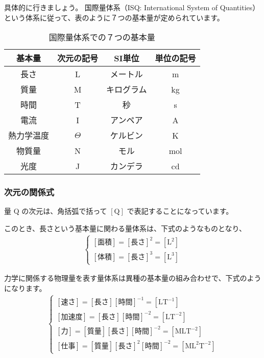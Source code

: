 \documentclass[uplatex,dvipdfmx,a4paper,11pt]{jsreport}
\begin{document}
具体的に行きましょう。
国際量体系（ISQ: International System of Quantities）という体系に従って、表のように７つの基本量が定められています。
\begin{table}[htb]
	\begin{center}
		\caption{国際量体系での７つの基本量}
		\label{tab:kihon}
		\begin{tabular}{|c|c||c|c|} \hline
			基本量 		& 次元の記号 & SI単位\index{たんい@単位} 		& 単位の記号\\ \hline \hline
			長さ		& L			& メートル 		& m \\ \hline
			質量		& M			& キログラム 	& kg \\ \hline
			時間		& T			& 秒 			& s \\ \hline
			電流		& I			& アンペア 		& A \\ \hline
			熱力学温度	& $\Theta$	& ケルビン 		& K \\ \hline
			物質量		& N			& モル 			& mol \\ \hline
			光度		& J			& カンデラ 		& cd \\ \hline
		\end{tabular}
	\end{center}
\end{table}

\subsubsection{次元の関係式}
量 $\mathrm{Q}$ の次元は、角括弧で括って $[\mathrm{Q}]$ で表記することになっています。

このとき、長さという基本量に関わる量体系は、下式のようなものとなり、
\begin{align*}
	\begin{cases}
		[\text{面積}] = [\text{長さ}]^2 = [\mathrm{L}^2] \\[8pt]
		[\text{体積}] = [\text{長さ}]^3 = [\mathrm{L}^3]
	\end{cases}
\end{align*}

力学に関係する物理量を表す量体系は異種の基本量の組み合わせで、下式のようになります。
\begin{align*}
	\begin{cases}
		[\text{速さ}] = [\text{長さ}][\text{時間}]^{-1} = [\mathrm{LT}^{-1}] \\[8pt]
		[\text{加速度}] = [\text{長さ}][\text{時間}]^{-2} = [\mathrm{LT}^{-2}] \\[8pt]
		[\text{力}] = [\text{質量}][\text{長さ}][\text{時間}]^{-2} = [\mathrm{MLT}^{-2}] \\[8pt]
		[\text{仕事}] = [\text{質量}][\text{長さ}]^2[\text{時間}]^{-2} = [\mathrm{ML}^2\mathrm{T}^{-2}]
	\end{cases}
\end{align*}
\end{document}
